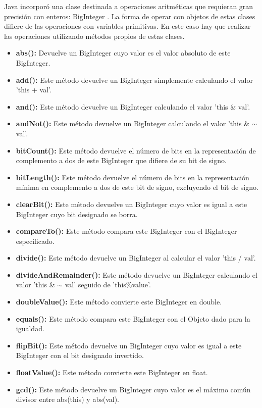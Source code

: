 Java incorporó una clase destinada a operaciones aritméticas que requieran gran
 precisión con enteros: BigInteger . La forma de operar con objetos de estas clases difiere de las
 operaciones con variables primitivas. En este caso hay que realizar las operaciones utilizando
métodos propios de estas clases.
\begin{itemize}
\item \textbf{abs():} Devuelve un BigInteger cuyo valor es el valor absoluto de este BigInteger.
\item \textbf{add():} Este método devuelve un BigInteger simplemente calculando el valor 'this + val'.
\item \textbf{and():} Este método devuelve un BigInteger calculando el valor 'this \& val'.
\item \textbf{andNot():} Este método devuelve un BigInteger calculando el valor 'this \& $\sim$ val'.
\item \textbf{bitCount():} Este método devuelve el número de bits en la representación de complemento a dos de este BigInteger que difiere de su bit de signo.
\item \textbf{bitLength():} Este método devuelve el número de bits en la representación mínima en complemento a dos de este bit de signo, excluyendo el bit de signo.
\item \textbf{clearBit():} Este método devuelve un BigInteger cuyo valor es igual a este BigInteger cuyo bit designado se borra.
\item \textbf{compareTo():} Este método compara este BigInteger con el BigInteger especificado.
\item \textbf{divide():} Este método devuelve un BigInteger al calcular el valor 'this / val'.
\item \textbf{divideAndRemainder():} Este método devuelve un BigInteger calculando el valor 'this \& $\sim$ val' seguido de 'this\%value'.
\item \textbf{doubleValue():} Este método convierte este BigInteger en double.
\item \textbf{equals():} Este método compara este BigInteger con el Objeto dado para la igualdad. 
\item \textbf{flipBit():} Este método devuelve un BigInteger cuyo valor es igual a este BigInteger con el bit designado invertido.
\item \textbf{floatValue():} Este método convierte este BigInteger en float.
\item \textbf{gcd():} Este método devuelve un BigInteger cuyo valor es el máximo común divisor entre abs(this) y abs(val).

\end{itemize}
